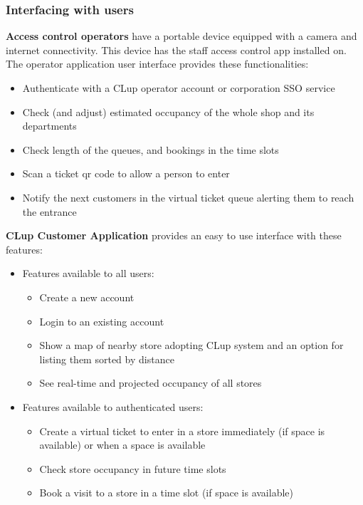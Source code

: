 \subsubsection{Interfacing with users}

\textbf{Access control operators} have a portable device equipped with a camera and internet connectivity. This device has the staff access control app installed on. The operator application user interface provides these functionalities:
\begin{itemize}
    \item Authenticate with a CLup operator account or corporation SSO service
    \item Check (and adjust) estimated occupancy of the whole shop and its departments
    \item Check length of the queues, and bookings in the time slots
    \item Scan a ticket qr code to allow a person to enter
    \item Notify the next customers in the virtual ticket queue alerting them to reach the entrance
\end{itemize}

\textbf{CLup Customer Application} provides an easy to use interface with these features:
\begin{itemize}
    \item Features available to all users:
    \begin{itemize}
        \item Create a new account 
        \item Login to an existing account
        \item Show a map of nearby store adopting CLup system and an option for listing them sorted by distance
        \item See real-time and projected occupancy of all stores
    \end{itemize}
    \item Features available to authenticated users:
    \begin{itemize}
        \item Create a virtual ticket to enter in a store immediately (if space is available) or when a space is available
        \item Check store occupancy in future time slots
        \item Book a visit to a store in a time slot (if space is available) 
    \end{itemize}
\end{itemize}

